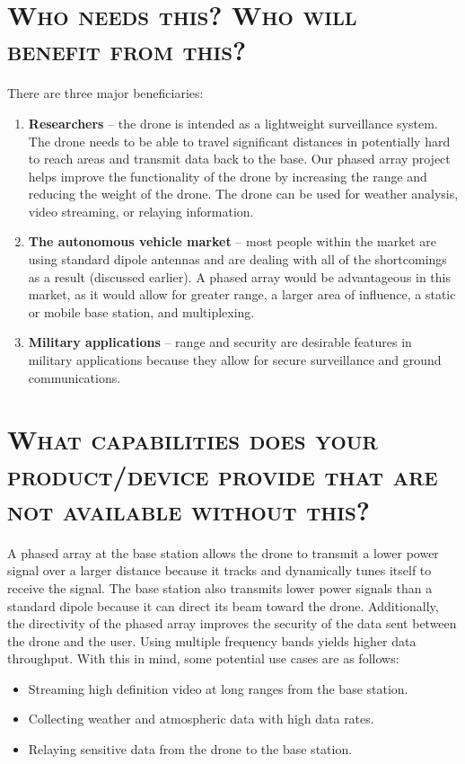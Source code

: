 \documentclass[11pt]{article}
\numberwithin{figure}{section}
\begin{document}
\section{\textsc{Who needs this? Who will benefit from this?}}
There are three major beneficiaries: 
	\begin{enumerate}
		\item \textbf{Researchers} -- the drone is intended as a lightweight surveillance system. The drone needs to be able to travel significant distances in potentially hard to reach areas and transmit data back to the base. Our phased array project helps improve the functionality of the drone by increasing the range and reducing the weight of the drone. The drone can be used for weather analysis, video streaming, or relaying information.
		\item \textbf{The autonomous vehicle market} -- most people within the market are using standard dipole antennas and are dealing with all of the shortcomings as a result (discussed earlier). A phased array would be advantageous in this market, as it would allow for greater range, a larger area of influence, a static or mobile base station, and multiplexing.
		\item \textbf{Military applications} -- range and security are desirable features in military applications because they allow for secure surveillance and ground communications.
	\end{enumerate}

\section{\textsc{What capabilities does your product/device provide that are not available without this?}}
A phased array at the base station allows the drone to transmit a lower power signal over a larger distance because it tracks and dynamically tunes itself to receive the signal. The base station also transmits lower power signals than a standard dipole because it can direct its beam toward the drone. Additionally, the directivity of the phased array improves the security of the data sent between the drone and the user.  Using multiple frequency bands yields higher data throughput.  With this in mind, some potential use cases are as follows:
	\begin{itemize}
		\item Streaming high definition video at long ranges from the base station.
		\item Collecting weather and atmospheric data with high data rates.
		\item Relaying sensitive data from the drone to the base station.
	\end{itemize}
\end{document}
